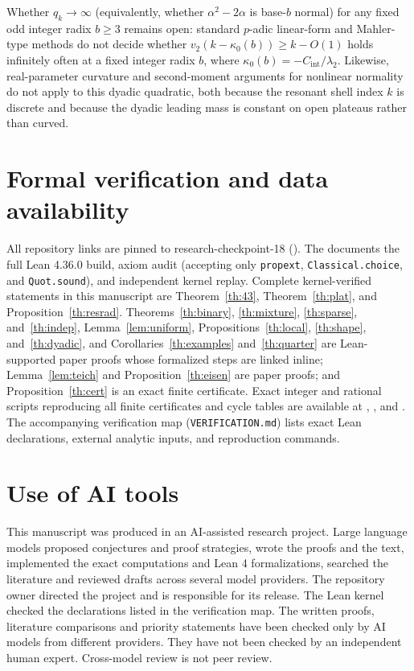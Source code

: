 \documentclass[11pt]{article}
\begin{document}
Whether $q_k\to\infty$ (equivalently, whether $\alpha^2-2\alpha$ is base-$b$ normal) for any fixed odd integer radix $b\ge3$ remains open: standard $p$-adic linear-form and Mahler-type methods \cite{bugeaud_laurent,nishioka} do not decide whether $v_2(k-\kappa_0(b))\ge k-O(1)$ holds infinitely often at a fixed integer radix $b$, where $\kappa_0(b)=-C_{\mathrm{int}}/\lambda_2$. Likewise, real-parameter curvature and second-moment arguments for nonlinear normality do not apply to this dyadic quadratic, both because the resonant shell index $k$ is discrete and because the dyadic leading mass is constant on open plateaus rather than curved.

\section*{Formal verification and data availability}
All repository links are pinned to research-checkpoint-18 (). The  documents the full Lean 4.36.0 build, axiom audit (accepting only \texttt{propext}, \texttt{Classical.choice}, and \texttt{Quot.sound}), and independent kernel replay. Complete kernel-verified statements in this manuscript are Theorem~\ref{th:43}, Theorem~\ref{th:plat}, and Proposition~\ref{th:resrad}. Theorems~\ref{th:binary}, \ref{th:mixture}, \ref{th:sparse}, and~\ref{th:indep}, Lemma~\ref{lem:uniform}, Propositions~\ref{th:local}, \ref{th:shape}, and~\ref{th:dyadic}, and Corollaries~\ref{th:examples} and~\ref{th:quarter} are Lean-supported paper proofs whose formalized steps are linked inline; Lemma~\ref{lem:teich} and Proposition~\ref{th:eisen} are paper proofs; and Proposition~\ref{th:cert} is an exact finite certificate. Exact integer and rational scripts reproducing all finite certificates and cycle tables are available at , , and . The accompanying verification map (\texttt{VERIFICATION.md}) lists exact Lean declarations, external analytic inputs, and reproduction commands.

\section*{Use of AI tools}
This manuscript was produced in an AI-assisted research project. Large language models proposed conjectures and proof strategies, wrote the proofs and the text, implemented the exact computations and Lean 4 formalizations, searched the literature and reviewed drafts across several model providers. The repository owner directed the project and is responsible for its release. The Lean kernel checked the declarations listed in the verification map. The written proofs, literature comparisons and priority statements have been checked only by AI models from different providers. They have not been checked by an independent human expert. Cross-model review is not peer review.



\end{document}
